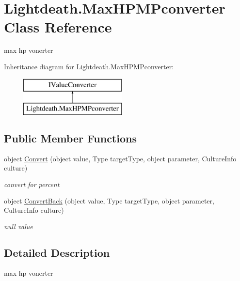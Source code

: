 \hypertarget{class_lightdeath_1_1_max_h_p_m_pconverter}{}\section{Lightdeath.\+Max\+H\+P\+M\+Pconverter Class Reference}
\label{class_lightdeath_1_1_max_h_p_m_pconverter}


max hp vonerter  


Inheritance diagram for Lightdeath.\+Max\+H\+P\+M\+Pconverter\+:\begin{figure}[H]
\begin{center}
\leavevmode
\includegraphics[height=2.000000cm]{class_lightdeath_1_1_max_h_p_m_pconverter}
\end{center}
\end{figure}
\subsection*{Public Member Functions}
\begin{DoxyCompactItemize}
\item 
object \hyperlink{class_lightdeath_1_1_max_h_p_m_pconverter_a5329f10ec255da8e25150a727ea6d4ba}{Convert} (object value, Type target\+Type, object parameter, Culture\+Info culture)
\begin{DoxyCompactList}\small\item\em convert for percent \end{DoxyCompactList}\item 
object \hyperlink{class_lightdeath_1_1_max_h_p_m_pconverter_aee9054cfd7587b56f70d31444a11f10f}{Convert\+Back} (object value, Type target\+Type, object parameter, Culture\+Info culture)
\begin{DoxyCompactList}\small\item\em null value \end{DoxyCompactList}\end{DoxyCompactItemize}


\subsection{Detailed Description}
max hp vonerter 



